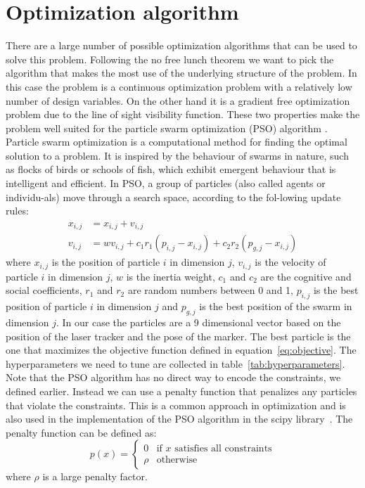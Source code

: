 \documentclass{svproc}
\begin{document}
\section{Optimization algorithm}
There are a large number of possible optimization algorithms that can be used to solve this problem.
Following the no free lunch theorem \cite{no_free_lunch_theorem} we want to pick the algorithm that makes the most use of the underlying structure of the problem.
In this case the problem is a continuous optimization problem with a relatively low number of design variables.
On the other hand it is a gradient free optimization problem due to the line of sight visibility function.
These two properties make the problem well suited for the particle swarm optimization (PSO) algorithm \cite{pso}.
Particle swarm optimization is a computational method for finding the optimal solution to a problem.
It is inspired by the behaviour of swarms in nature, such as flocks of birds or schools of fish, which exhibit emergent behaviour that is intelligent and efficient.
 In PSO, a group of particles (also called agents or individu-als) move through a search space, according to the fol-lowing update rules:
\begin{equation}
        \begin{split}
        x_{i,j} &= x_{i,j} + v_{i,j} \\
    v_{i,j} &= wv_{i,j} + c_1r_1(p_{i,j}-x_{i,j}) + c_2r_2(p_{g,j}-x_{i,j})
        \end{split}
\end{equation}
where $x_{i,j}$ is the position of particle $i$ in dimension $j$, $v_{i,j}$ is the velocity of particle $i$ in dimension $j$, $w$ is the inertia weight,
 $c_1$ and $c_2$ are the cognitive and social coefficients, $r_1$ and $r_2$ are random numbers between 0 and 1, $p_{i,j}$ is the best position of particle $i$ in dimension $j$ and $p_{g,j}$
is the best position of the swarm in dimension $j$.
In our case the particles are a 9 dimensional vector based on the position of the laser tracker and the pose of the marker.
The best particle is the one that maximizes the objective function defined in equation~\ref{eq:objective}.
The hyperparameters we need to tune are collected in table~\ref{tab:hyperparameters}.
Note that the PSO algorithm has no direct way to encode the constraints, we defined earlier.
Instead we can use a penalty function that penalizes any particles that violate the constraints.
This is a common approach in optimization and is also used in the implementation of the PSO algorithm in the scipy library~\cite{2020SciPy-NMeth}.
The penalty function can be defined as:
\begin{equation}
    p(x) =  \begin{cases}
        0 & \text{if } x \text{ satisfies all constraints} \\
        \rho & \text{otherwise}
    \end{cases}
\end{equation}
where $\rho$ is a large penalty factor.
\end{document}
